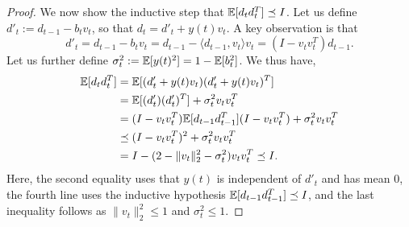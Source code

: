 \begin{proof}
  We now show the inductive step that $\mathbb{E}[d_{t}d_{t}^T]\preceq I$. Let us define $d'_t := d_{t-1} -b_t v_t$, so that $d_t = d'_t + y(t)v_t$.
  A key observation is that
  \[d'_t = d_{t-1} - b_t v_t = d_{t-1} - \langle d_{t-1},v_t \rangle v_t =  (I - v_tv_t^T)d_{t-1}.\]
 Let us further define $\sigma_t^2:= \mathbb{E}[y(t)^2] = 1-\mathbb{E}[b_t^2]$. We thus have,
    \begin{align*}
    \mathbb{E}[d_td_t^T]
    &= \mathbb{E}[(d'_t + y(t) v_t)(d'_t + y(t) v_t)^T]\\
    &= \mathbb{E}[(d'_t) (d'_t)^T] + \sigma_t^2 v_t v_t^T\\
    &= (I-v_t v_t^T)\mathbb{E}[d_{t-1}d_{t-1}^T](I-v_t v_t^T) + \sigma_t^2v_t v_t^T\\
    &\preceq (I-v_t v_t^T)^2 + \sigma_t^2v_t v_t^T \\
    & = I - (2- \|v_t\|_2^2 - \sigma_t^2) v_tv_t^T  \preceq I.
    \end{align*}
    Here, the second equality uses that $y(t)$ is independent of $d'_t$ and has mean $0$, the fourth line uses the inductive hypothesis $\mathbb{E}[d_{t-1}d_{t-1}^T]\preceq I$, and the last inequality follows as $\|v_t\|_2^2 \le 1$ and $\sigma_t^2 \le 1$.
%
\end{proof}

